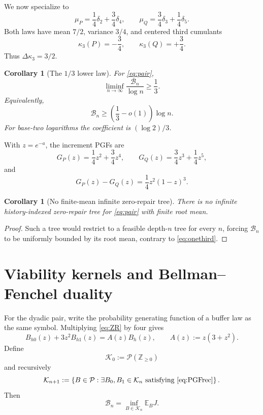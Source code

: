 \documentclass[11pt,a4paper]{article}
\newtheorem{corollary}[theorem]{Corollary}
\theoremstyle{definition}
\theoremstyle{remark}
\newcommand{\E}{\mathbb E}
\newcommand{\Z}{\mathbb Z}
\newcommand{\cP}{\mathcal P}
\newcommand{\cK}{\mathcal K}
\newcommand{\cB}{\mathcal B}
\begin{document}
We now specialize to
\begin{equation}
 \boxed{
 \mu_P=\frac14\delta_2+\frac34\delta_4,
 \qquad
 \mu_Q=\frac34\delta_3+\frac14\delta_5.
 }
 \label{eq:pair}
\end{equation}
Both laws have mean \(7/2\), variance \(3/4\), and centered third cumulants
\[
 \kappa_3(P)=-\frac34,
 \qquad
 \kappa_3(Q)=+\frac34.
\]
Thus \(\Delta\kappa_3=3/2\).

\begin{corollary}[The \(1/3\) lower law]
\label{cor:one-third}
For \eqref{eq:pair},
\begin{equation}
 \boxed{
 \liminf_{n\to\infty}\frac{\cB_n}{\log n}\ge\frac13.
 }
 \label{eq:onethird}
\end{equation}
Equivalently,
\[
 \cB_n\ge\left(\frac13-o(1)\right)\log n.
\]
For base-two logarithms the coefficient is \((\log2)/3\).
\end{corollary}

With \(z=e^{-a}\), the increment PGFs are
\[
 G_P(z)=\frac14z^2+\frac34z^4,
 \qquad
 G_Q(z)=\frac34z^3+\frac14z^5,
\]
and
\begin{equation}
 \boxed{
 G_P(z)-G_Q(z)=\frac14z^2(1-z)^3.
 }
 \label{eq:cubicPGF}
\end{equation}

\begin{corollary}[No finite-mean infinite zero-repair tree]
There is no infinite history-indexed zero-repair tree for \eqref{eq:pair} with
finite root mean.
\end{corollary}

\begin{proof}
Such a tree would restrict to a feasible depth-\(n\) tree for every \(n\),
forcing \(\cB_n\) to be uniformly bounded by its root mean, contrary to
\eqref{eq:onethird}.
\end{proof}

\section{Viability kernels and Bellman--Fenchel duality}
\label{sec:dual}

For the dyadic pair, write the probability generating function of a buffer law
as the same symbol.  Multiplying \eqref{eq:ZR} by four gives
\begin{equation}
 \boxed{
 B_{h0}(z)+3z^2B_{h1}(z)=A(z)B_h(z),
 \qquad A(z):=z(3+z^2).
 }
 \label{eq:PGFrec}
\end{equation}
Define
\[
 \cK_0:=\cP(\Z_{\ge0})
\]
and recursively
\begin{equation}
 \cK_{n+1}:=
 \left\{B\in\cP:
 \exists B_0,B_1\in\cK_n\text{ satisfying \eqref{eq:PGFrec}}\right\}.
 \label{eq:Kndef}
\end{equation}
Then
\[
 \cB_n=\inf_{B\in\cK_n}\E_BJ.
\]
\end{document}

